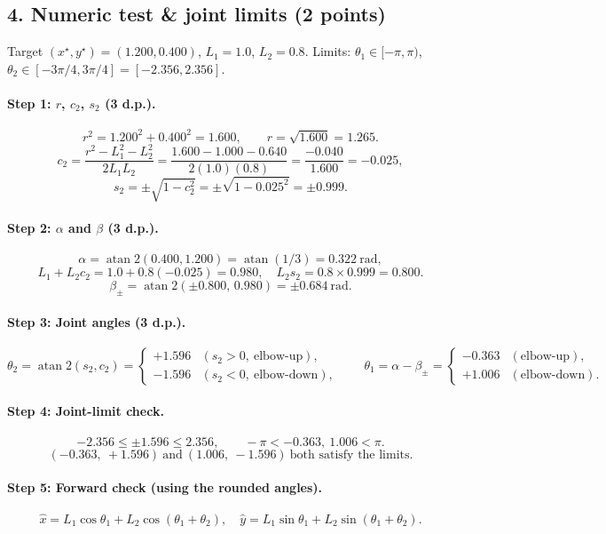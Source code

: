 \documentclass[11pt]{article}
\DeclareMathOperator{\atan}{atan}
\begin{document}
\subsection*{4. Numeric test \& joint limits (2 points)}
Target $(x^\star,y^\star)=(1.200,0.400)$, $L_1=1.0$, $L_2=0.8$.
Limits: $\theta_1\in[-\pi,\pi)$, $\theta_2\in[-3\pi/4,3\pi/4]=[-2.356,2.356]$.

\paragraph{Step 1: $r$, $c_2$, $s_2$ (3 d.p.).}
\[
r^2 = 1.200^2+0.400^2 = 1.600,\qquad r=\sqrt{1.600}= \boxed{1.265}.
\]
\[
c_2=\frac{r^2-L_1^2-L_2^2}{2L_1L_2}
=\frac{1.600-1.000-0.640}{2(1.0)(0.8)}
=\frac{-0.040}{1.600}= \boxed{-0.025},
\]
\[
s_2=\pm\sqrt{1-c_2^2}= \pm\sqrt{1-0.025^2}= \boxed{\pm 0.999}.
\]

\paragraph{Step 2: $\alpha$ and $\beta$ (3 d.p.).}
\[
\alpha=\atan2(0.400,1.200)=\atan(1/3)= \boxed{0.322}\ \text{rad},
\]
\[
L_1+L_2c_2=1.0+0.8(-0.025)=0.980,\quad L_2s_2=0.8\times 0.999=0.800.
\]
\[
\beta_{\pm}=\atan2(\pm 0.800,\,0.980)= \boxed{\pm 0.684}\ \text{rad}.
\]

\paragraph{Step 3: Joint angles (3 d.p.).}
\[
\theta_2=\atan2(s_2,c_2)=
\begin{cases}
\boxed{+1.596} & (s_2>0,\ \text{elbow-up}),\\
\boxed{-1.596} & (s_2<0,\ \text{elbow-down}),
\end{cases}
\qquad
\theta_1=\alpha-\beta_{\pm}=
\begin{cases}
\boxed{-0.363} & (\text{elbow-up}),\\
\boxed{+1.006} & (\text{elbow-down}).
\end{cases}
\]

\paragraph{Step 4: Joint-limit check.}
\[
-2.356\le \pm 1.596 \le 2.356,\qquad -\pi< -0.363,\ 1.006 < \pi.
\]
\[
\boxed{(-0.363,\ +1.596)}\ \text{and}\ \boxed{(1.006,\ -1.596)}\ \text{both satisfy the limits.}
\]

\paragraph{Step 5: Forward check (using the rounded angles).}
\[
\hat x=L_1\cos\theta_1+L_2\cos(\theta_1+\theta_2),\quad
\hat y=L_1\sin\theta_1+L_2\sin(\theta_1+\theta_2).
\]
\end{document}
